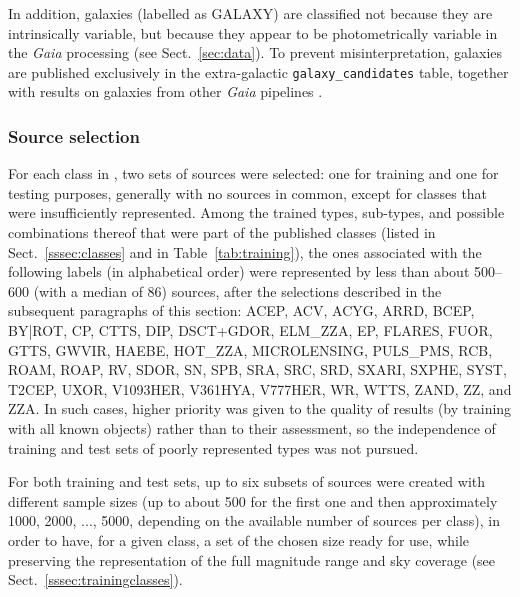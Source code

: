 \documentclass[longauth]{aa}
\def\gaia{\textit{Gaia}\xspace}
\begin{document}
In addition, galaxies (labelled as GALAXY) are classified not because they are intrinsically variable, but because they appear to be photometrically variable in the \gaia processing (see Sect.~\ref{sec:data}).
To prevent misinterpretation, galaxies are published exclusively in the extra-galactic \texttt{galaxy\_candidates} table, together with results on galaxies from other \gaia pipelines \citep{DR3-CU4,DR3-AP3}.


\subsubsection{Source selection\label{sssec:selection}}

For each class in \citet{DR3-DPACP-177}, two sets of sources were selected: one for training and one for testing purposes, generally with no sources in common, except for classes that were insufficiently represented. 
Among the trained types, sub-types, and possible combinations thereof that were part of the published classes (listed in Sect.~\ref{sssec:classes} and in Table~\ref{tab:training}), the ones associated with the following labels (in alphabetical order) were represented by less than about 500--600 (with a median of 86) sources, after the selections described in the subsequent paragraphs of this section: ACEP, ACV, ACYG, ARRD, BCEP, BY|ROT, CP, CTTS, DIP, DSCT+GDOR, ELM\_ZZA, EP, FLARES, FUOR, GTTS, GWVIR, HAEBE, HOT\_ZZA, MICROLENSING, PULS\_PMS, RCB, ROAM, ROAP, RV, SDOR, SN, SPB, SRA, SRC, SRD, SXARI, SXPHE, SYST, T2CEP, UXOR, V1093HER, V361HYA, V777HER, WR, WTTS, ZAND, ZZ, and ZZA.
In such cases, higher priority was given to the quality of results (by training with all known objects) rather than to their assessment, so the independence of training and test sets of poorly represented types was not pursued. 

For both training and test sets, up to six subsets of sources were created with different sample sizes (up to about 500 for the first one and then approximately 1000, 2000, ..., 5000, depending on the available number of sources per class), in order to have, for a given class, a set of the chosen size ready for use, while preserving the representation of the full magnitude range and sky coverage (see Sect.~\ref{sssec:trainingclasses}). 
\end{document}
